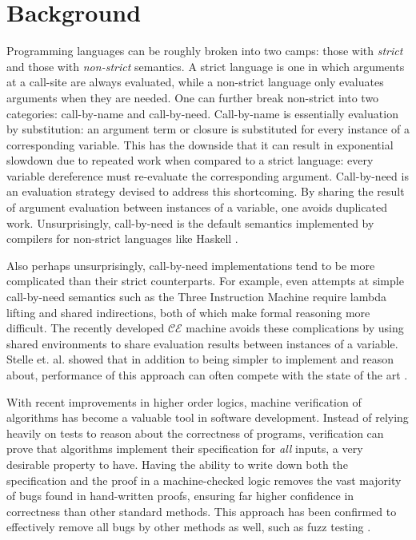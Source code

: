 \section{Background} \label{sec:background}

Programming languages can be roughly broken into two camps: those with
\emph{strict} and those with \emph{non-strict} semantics. A strict language is
one in which arguments at a call-site are always evaluated, while a non-strict
language only evaluates arguments when they are needed. One can further break
non-strict into two categories: call-by-name and call-by-need. Call-by-name is
essentially evaluation by substitution: an argument term or closure is
substituted for every instance of a corresponding variable. This has the
downside that it can result in exponential slowdown due to repeated work when
compared to a strict language: every variable dereference must re-evaluate the
corresponding argument. Call-by-need is an evaluation strategy devised to
address this shortcoming. By sharing the result of argument evaluation between
instances of a variable, one avoids duplicated work.  Unsurprisingly,
call-by-need is the default semantics implemented by compilers for non-strict
languages like Haskell \cite{jonesstg}. 

Also perhaps unsurprisingly, call-by-need implementations tend to be more
complicated than their strict counterparts. For example, even attempts at simple
call-by-need semantics such as the Three Instruction Machine require lambda
lifting and shared indirections, both of which make formal reasoning more
difficult. The recently developed $\mathcal{CE}$ machine avoids these
complications by using shared environments to share evaluation results between
instances of a variable. Stelle et. al. showed that in addition to being simpler
to implement and reason about, performance of this approach can often compete
with the state of the art \cite{cem}. 

With recent improvements in higher order logics, machine verification of
algorithms has become a valuable tool in software development. Instead of
relying heavily on tests to reason about the correctness of programs,
verification can prove that algorithms implement their specification for
\emph{all} inputs, a very desirable property to have. Having the ability to
write down both the specification and the proof in a machine-checked logic
removes the vast majority of bugs found in hand-written proofs, ensuring far
higher confidence in correctness than other standard methods. This approach has
been confirmed to effectively remove all bugs by other methods as well, such as
fuzz testing \cite{yangfuzz}.


